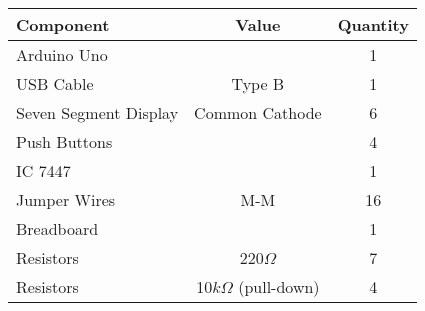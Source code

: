 \begin{tabular}{|l|c|c|}
\hline
Component & Value & Quantity\\
\hline
Arduino Uno & & 1\\
\hline
USB Cable & Type B & 1\\
\hline
Seven Segment Display & Common Cathode & 6\\
\hline
Push Buttons & & 4\\
\hline
IC 7447  &  & 1\\
\hline
Jumper Wires & M-M & 16\\
\hline
Breadboard & & 1\\
\hline
Resistors & 220$\Omega$ & 7\\
\hline
Resistors & 10$k\Omega$ (pull-down) & 4\\
\hline
\end{tabular}

